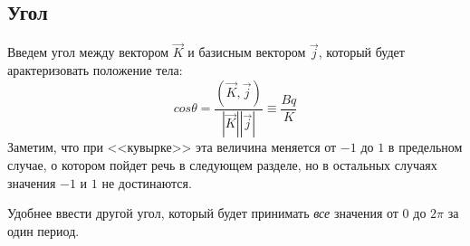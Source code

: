 \documentclass{article}
\begin{document}
\subsection{Угол}
Введем угол между вектором \begin{math} \vec{K} \end{math} и базисным вектором \begin{math} \vec{j} \end{math}, который будет арактеризовать положение тела:
\begin{equation}
\label{thetaEquation}
cos\theta=\frac{(\vec{K},\vec{j})}{|\vec{K}||\vec{j}|}\equiv\frac{Bq}{K}
\end{equation}
Заметим, что при <<кувырке>> эта величина меняется от \begin{math} -1 \end{math} до \begin{math} 1 \end{math} в предельном случае, о котором пойдет речь в следующем разделе, но в остальных случаях значения \begin{math} -1 \end{math} и \begin{math} 1 \end{math} не достинаются.

Удобнее ввести другой угол, который будет принимать {\em все} значения от \begin{math} 0 \end{math} до \begin{math} 2\pi \end{math} за один период.
\end{document}
